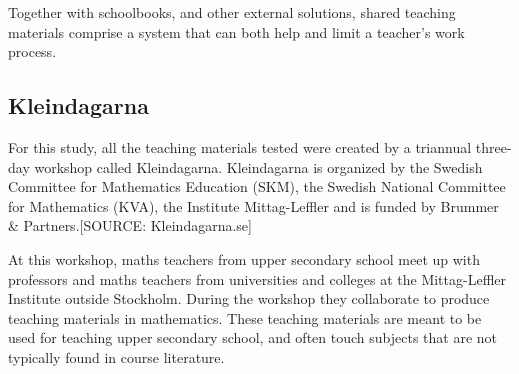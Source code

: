 Together with schoolbooks, and other external solutions, shared teaching materials comprise a system that can both help and limit a teacher's work process.

\subsection{Kleindagarna}
For this study, all the teaching materials tested were created by a triannual three-day workshop called Kleindagarna. Kleindagarna is organized by the Swedish Committee for Mathematics Education (SKM), the Swedish National Committee for Mathematics (KVA), the Institute Mittag-Leffler and is funded by Brummer \& Partners.[SOURCE: Kleindagarna.se]

At this workshop, maths teachers from upper secondary school meet up with professors and maths teachers from universities and colleges at the Mittag-Leffler Institute outside Stockholm. During the workshop they collaborate to produce teaching materials in mathematics. These teaching materials are meant to be used for teaching upper secondary school, and often touch subjects that are not typically found in course literature.
